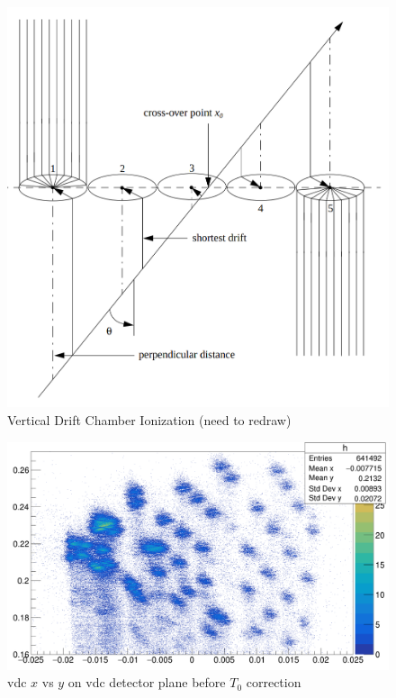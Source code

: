 \begin{figure}
    \centering
    \includegraphics[scale = 0.25]{images/chap3/vdc_wire_ionize.png}
    \caption{Vertical Drift Chamber Ionization (need to redraw)}
    \label{fig:vdc_wire_ionization_cluster}
\end{figure}

\begin{figure}
    \centering
    \includegraphics[width=\textwidth]{images/chap3/vdc_t0_before_correction.png}
    \caption{vdc $x$ vs $y$ on vdc detector plane before $T_0$ correction}
    \label{fig:vdc_t0_before_correction}
\end{figure}


